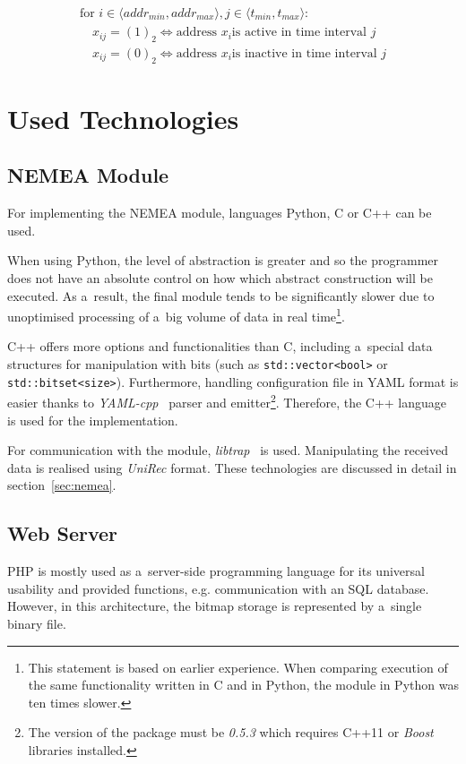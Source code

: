 \begin{equation}\label{eq:image}
   \begin{multlined}
   \mbox{for }i \in \langle addr_{min}, addr_{max}\rangle, j \in \langle t_{min}, t_{max} \rangle: \\
   \quad x_{ij} = (1)_2 \Leftrightarrow \mbox{address } x_i \mbox{is active in time interval } j \\
   \quad x_{ij} = (0)_2 \Leftrightarrow \mbox{address } x_i \mbox{is inactive in time interval } j
   \end{multlined} 
\end{equation}

\section{Used Technologies}
\subsection {NEMEA Module}
For implementing the NEMEA module, languages Python, C or C++ can be used.

When using Python, the level of abstraction is greater and so the programmer
does not have an absolute control on how which abstract construction will be executed.
As a~result, the final module tends to be significantly slower due to unoptimised processing of
a~big volume of data in real time\footnote{This statement is based on earlier experience. When comparing
execution of the same functionality written in C and in Python, the module in Python was ten times slower.}.

C++ offers more options and functionalities than C, including a~special data structures for manipulation with bits
(such as \texttt{std::vector<bool>} or \texttt{std::bitset<size>}).
Furthermore, handling configuration file in YAML format is easier thanks to
\textit{YAML-cpp}~\cite{yaml_cpp} parser and emitter\footnote{The version of the package
must be \textit{0.5.3} which requires C++11 or \textit{Boost}~\cite{cppboost} libraries installed.}.
Therefore, the C++ language is used for the implementation.

For communication with the module, \textit{libtrap}~\cite{libtrap} is used.
Manipulating the received data is realised using \textit{UniRec} format.
These technologies are discussed in detail in section~\ref{sec:nemea}. 

\subsection{Web Server}\label{sec:python_packages}
PHP is mostly used as a~server-side programming language
for its universal usability and provided functions, e.g. communication with an SQL database.
However, in this architecture, the bitmap storage is represented by a~single binary file.

